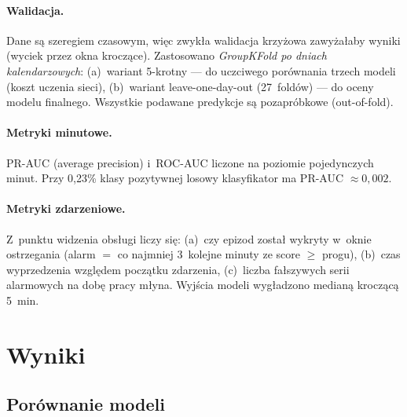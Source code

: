 \documentclass[11pt,a4paper]{article}
\begin{document}
\paragraph{Walidacja.} Dane są szeregiem czasowym, więc zwykła walidacja
krzyżowa zawyżałaby wyniki (wyciek przez okna kroczące). Zastosowano
\emph{GroupKFold po dniach kalendarzowych}: (a)~wariant 5-krotny --- do
uczciwego porównania trzech modeli (koszt uczenia sieci), (b)~wariant
leave-one-day-out (27~foldów) --- do oceny modelu finalnego. Wszystkie
podawane predykcje są pozapróbkowe (out-of-fold).

\paragraph{Metryki minutowe.} PR-AUC (average precision) i~ROC-AUC liczone
na poziomie pojedynczych minut. Przy 0{,}23\% klasy pozytywnej losowy
klasyfikator ma PR-AUC $\approx 0{,}002$.

\paragraph{Metryki zdarzeniowe.} Z~punktu widzenia obsługi liczy się:
(a)~czy epizod został wykryty w~oknie ostrzegania (alarm $=$ co najmniej
3~kolejne minuty ze score $\ge$ progu), (b)~czas wyprzedzenia względem
początku zdarzenia, (c)~liczba fałszywych serii alarmowych na dobę pracy
młyna. Wyjścia modeli wygładzono medianą kroczącą 5~min.

\section{Wyniki}

\subsection{Porównanie modeli}
\end{document}
